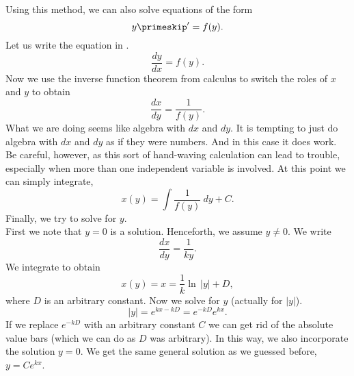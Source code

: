 Using this method, we can also solve equations of the form
\begin{equation*}
y\primeskip ' = f(y) .
\end{equation*}
Let us write the equation in .
\begin{equation*}
\frac{dy}{dx} = f(y) .
\end{equation*}
Now we use the inverse function theorem from calculus
to switch the roles of $x$ and $y$
to obtain
\begin{equation*}
\frac{dx}{dy} = \frac{1}{f(y)} .
\end{equation*}
What
we are doing seems like algebra with $dx$ and $dy$.
It is tempting to just do algebra with $dx$
and $dy$ as if they were numbers.  And in this case it does work.  Be
careful,
however, as this sort of hand-waving calculation can lead to trouble,
especially when
more than one independent variable is involved.
At this point we can simply integrate,
\begin{equation*}
x(y) = \int \frac{1}{f(y)} ~dy + C .
\end{equation*}
Finally, we try to solve for $y$.\\

{First we note that $y=0$ is a solution.
Henceforth, we assume $y\not= 0$.  We write
\begin{equation*}
\frac{dx}{dy} = \frac{1}{ky} .
\end{equation*}
We integrate to obtain
\begin{equation*}
x(y) = x = \frac{1}{k} \ln \, \lvert y \rvert + D,
\end{equation*}
where $D$ is an arbitrary constant.
Now we solve for $y$ (actually for $\lvert y \rvert$).
\begin{equation*}
\lvert y \rvert =
e^{kx-kD} = 
e^{-kD} e^{k x} .
\end{equation*}
If we replace $e^{-kD}$ with an arbitrary constant $C$ we can
get rid of the absolute value bars (which we can do as $D$ was arbitrary).  In
this way, we
also incorporate the solution $y=0$.  We get the same general solution as
we guessed before, $y = Ce^{kx}$.
}\\

